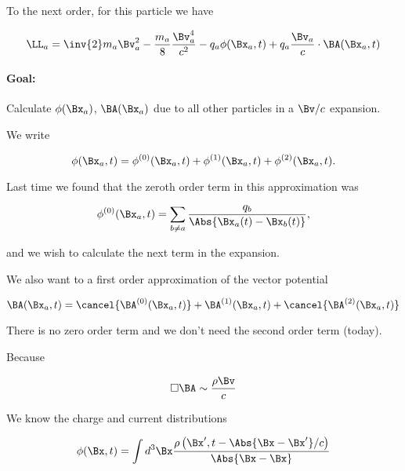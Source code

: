 To the next order, for this particle we have

\begin{equation}\label{eqn:relativisticElectrodynamicsL25:110}
\LL_a = \inv{2} m_a \Bv_a^2 - \frac{m_a}{8} \frac{\Bv_a^4}{c^2} - q_a \phi(\Bx_a, t) + q_a \frac{\Bv_a}{c} \cdot \BA(\Bx_a, t)
\end{equation}

\paragraph{Goal:} Calculate $\phi(\Bx_a)$, $\BA(\Bx_a)$ due to all other particles in a $\Bv/c$ expansion.

We write

\begin{equation}\label{eqn:relativisticElectrodynamicsL25:130}
\phi(\Bx_a, t) = 
\phi^{(0)}(\Bx_a, t)
+\phi^{(1)}(\Bx_a, t)
+\phi^{(2)}(\Bx_a, t).
\end{equation}

Last time we found that the zeroth order term in this approximation was

\begin{equation}\label{eqn:relativisticElectrodynamicsL25:150}
\phi^{(0)}(\Bx_a, t) = \sum_{b \ne a} \frac{q_b}{\Abs{\Bx_a(t) - \Bx_b(t)}},
\end{equation}

and we wish to calculate the next term in the expansion.

We also want to a first order approximation of the vector potential

\begin{equation}\label{eqn:relativisticElectrodynamicsL25:170}
\BA(\Bx_a, t) = 
\cancel{\BA^{(0)}(\Bx_a, t)}
+\BA^{(1)}(\Bx_a, t)
+\cancel{\BA^{(2)}(\Bx_a, t)}
\end{equation}

There is no zero order term and we don't need the second order term (today).

Because

\begin{equation}\label{eqn:relativisticElectrodynamicsL25:190}
\square \BA \sim \frac{\rho \Bv}{c}
\end{equation}

We know the charge and current distributions

\begin{equation}\label{eqn:relativisticElectrodynamicsL25:210}
\phi(\Bx, t) = \int d^3 \Bx \frac{\rho\left(\Bx', t - \Abs{\Bx - \Bx'}/c\right)}{\Abs{\Bx - \Bx}}
\end{equation}

